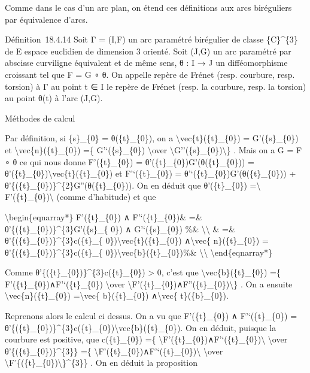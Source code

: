 \documentclass[]{article}
\begin{document}
Comme dans le cas d'un arc plan, on étend ces définitions aux arcs
biréguliers par équivalence d'arcs.

Définition~18.4.14 Soit Γ = (I,F) un arc paramétré birégulier de classe
\{C\}\^{}\{3\} de E espace euclidien de dimension 3 orienté. Soit (J,G)
un arc paramétré par abscisse curviligne équivalent et de même sens, θ :
I → J un difféomorphisme croissant tel que F = G ∘ θ. On appelle repère
de Frénet (resp. courbure, resp. torsion) à Γ au point t ∈ I le repère
de Frénet (resp. la courbure, resp. la torsion) au point θ(t) à l'arc
(J,G).

Méthodes de calcul

Par définition, si \{s\}\_\{0\} = θ(\{t\}\_\{0\}), on a
\textbackslash{}vec\{t\}(\{t\}\_\{0\}) = G'(\{s\}\_\{0\}) et
\textbackslash{}vec\{n\}(\{t\}\_\{0\}) =\{ G'`(\{s\}\_\{0\})
\textbackslash{}over
\textbackslash{}\textbar{}G''(\{s\}\_\{0\})\textbackslash{}\textbar{}\}
. Mais on a G = F ∘ θ ce qui nous donne F'(\{t\}\_\{0\}) =
θ'(\{t\}\_\{0\})G'(θ(\{t\}\_\{0\})) =
θ'(\{t\}\_\{0\})\textbackslash{}vec\{t\}(\{t\}\_\{0\}) et
F'`(\{t\}\_\{0\}) = θ'`(\{t\}\_\{0\})G'(θ(\{t\}\_\{0\})) +
θ'\{(\{t\}\_\{0\})\}\^{}\{2\}G''(θ(\{t\}\_\{0\})). On en déduit que
θ'(\{t\}\_\{0\}) =\textbackslash{}\textbar{}
F'(\{t\}\_\{0\})\textbackslash{}\textbar{} (comme d'habitude) et que

\textbackslash{}begin\{eqnarray*\} F'(\{t\}\_\{0\}) ∧
F'`(\{t\}\_\{0\})\& =\& θ'\{(\{t\}\_\{0\})\}\^{}\{3\}G'(\{s\}\_\{ 0\}) ∧
G'`(\{s\}\_\{0\}) \%\& \textbackslash{}\textbackslash{} \& =\&
θ'\{(\{t\}\_\{0\})\}\^{}\{3\}c(\{t\}\_\{
0\})\textbackslash{}vec\{t\}(\{t\}\_\{0\}) ∧\textbackslash{}vec\{
n\}(\{t\}\_\{0\}) = θ'\{(\{t\}\_\{0\})\}\^{}\{3\}c(\{t\}\_\{
0\})\textbackslash{}vec\{b\}(\{t\}\_\{0\})\%\&
\textbackslash{}\textbackslash{} \textbackslash{}end\{eqnarray*\}

Comme θ'\{(\{t\}\_\{0\})\}\^{}\{3\}c(\{t\}\_\{0\}) \textgreater{} 0,
c'est que \textbackslash{}vec\{b\}(\{t\}\_\{0\}) =\{
F'(\{t\}\_\{0\})∧F'`(\{t\}\_\{0\}) \textbackslash{}over
\textbackslash{}\textbar{}F'(\{t\}\_\{0\})∧F''(\{t\}\_\{0\})\textbackslash{}\textbar{}\}
. On a ensuite \textbackslash{}vec\{n\}(\{t\}\_\{0\})
=\textbackslash{}vec\{ b\}(\{t\}\_\{0\}) ∧\textbackslash{}vec\{
t\}(\{b\}\_\{0\}).

Reprenons alors le calcul ci dessus. On a vu que F'(\{t\}\_\{0\}) ∧
F'`(\{t\}\_\{0\}) =
θ'\{(\{t\}\_\{0\})\}\^{}\{3\}c(\{t\}\_\{0\})\textbackslash{}vec\{b\}(\{t\}\_\{0\}).
On en déduit, puisque la courbure est positive, que c(\{t\}\_\{0\}) =\{
\textbackslash{}\textbar{}F'(\{t\}\_\{0\})∧F'`(\{t\}\_\{0\})\textbackslash{}\textbar{}
\textbackslash{}over θ'\{(\{t\}\_\{0\})\}\^{}\{3\}\} =\{
\textbackslash{}\textbar{}F'(\{t\}\_\{0\})∧F'`(\{t\}\_\{0\})\textbackslash{}\textbar{}
\textbackslash{}over
\textbackslash{}\textbar{}F'\{(\{t\}\_\{0\})\textbackslash{}\textbar{}\}\^{}\{3\}\}
. On en déduit la proposition
\end{document}
